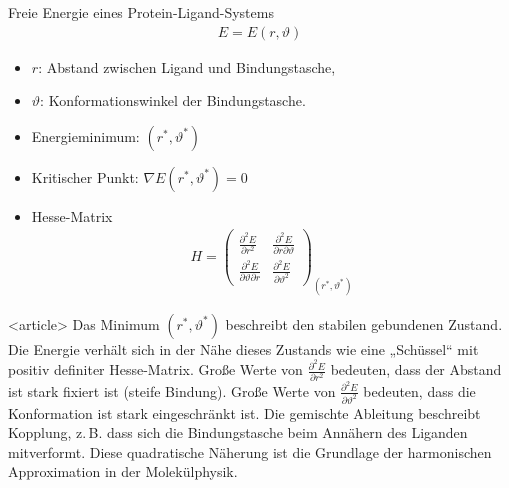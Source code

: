 \begin{frame}{Freie Energie eines Protein-Ligand-Systems}
  \begin{gather*}
E = E(r,\vartheta)
\end{gather*}
\begin{itemize}
\item \(r\): Abstand zwischen Ligand und Bindungstasche,
\item \(\vartheta\): Konformationswinkel der Bindungstasche.
\item Energieminimum: \((r^*, \vartheta^*)\)
\end{itemize}
\pause
\begin{itemize}
\item Kritischer Punkt: \(\nabla E(r^*,\vartheta^*) = 0\)
\item Hesse-Matrix
  \begin{gather*}
    H =
    \begin{pmatrix}
      \frac{\partial^2 E}{\partial r^2} & \frac{\partial^2 E}{\partial r \partial \vartheta} \\[1ex]
      \frac{\partial^2 E}{\partial \vartheta \partial r} & \frac{\partial^2 E}{\partial \vartheta^2}
    \end{pmatrix}_{(r^*,\vartheta^*)}
  \end{gather*}
\end{itemize}
\end{frame}

\begin{onlyenv}<article>
Das Minimum \( (r^*,\vartheta^*) \) beschreibt den stabilen gebundenen Zustand. Die Energie verhält sich in der Nähe dieses Zustands wie eine „Schüssel“ mit positiv definiter Hesse-Matrix.
Große Werte von \( \frac{\partial^2 E}{\partial r^2} \) bedeuten, dass der Abstand ist stark fixiert ist (steife Bindung).
Große Werte von \( \frac{\partial^2 E}{\partial \vartheta^2} \) bedeuten, dass die Konformation ist stark eingeschränkt ist.
Die gemischte Ableitung beschreibt Kopplung, z.\,B. dass sich die Bindungstasche beim Annähern des Liganden mitverformt.
Diese quadratische Näherung ist die Grundlage der harmonischen Approximation in der Molekülphysik.
\end{onlyenv}

